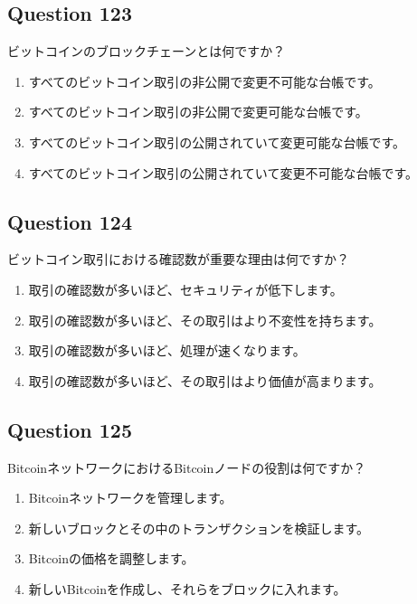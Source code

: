 \documentclass[12pt,a4paper]{article}
\begin{document}
\bigskip


\subsection*{Question 123}
ビットコインのブロックチェーンとは何ですか？

\begin{enumerate}[label=\Alph*., leftmargin=*]
\item すべてのビットコイン取引の非公開で変更不可能な台帳です。
\item すべてのビットコイン取引の非公開で変更可能な台帳です。
\item すべてのビットコイン取引の公開されていて変更可能な台帳です。
\item すべてのビットコイン取引の公開されていて変更不可能な台帳です。
\end{enumerate}

\bigskip


\subsection*{Question 124}
ビットコイン取引における確認数が重要な理由は何ですか？

\begin{enumerate}[label=\Alph*., leftmargin=*]
\item 取引の確認数が多いほど、セキュリティが低下します。
\item 取引の確認数が多いほど、その取引はより不変性を持ちます。
\item 取引の確認数が多いほど、処理が速くなります。
\item 取引の確認数が多いほど、その取引はより価値が高まります。
\end{enumerate}

\bigskip


\subsection*{Question 125}
BitcoinネットワークにおけるBitcoinノードの役割は何ですか？

\begin{enumerate}[label=\Alph*., leftmargin=*]
\item Bitcoinネットワークを管理します。
\item 新しいブロックとその中のトランザクションを検証します。
\item Bitcoinの価格を調整します。
\item 新しいBitcoinを作成し、それらをブロックに入れます。
\end{enumerate}
\end{document}
